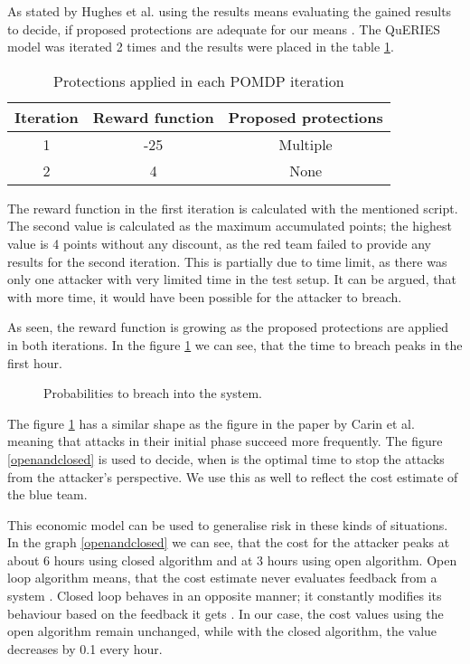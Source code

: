 As stated by Hughes et al. using the results means evaluating
the gained results to decide, if proposed protections are adequate for
our means \cite{hughes2013quantitative}. The QuERIES model was
iterated 2 times and the results were placed in the table \ref{iterationtable}.

\begin{table}[b!]
\centering
\begin{tabular}{|c|c|c|}
  \hline Iteration & Reward function & Proposed protections \\ \hline
  1 & -25 & Multiple \\ \hline 2 & 4 & None \\ \hline
\end{tabular}
\caption{Protections applied in each POMDP iteration}
\label{iterationtable}
\end{table}

The reward function in the first iteration is calculated with the
mentioned script. The second value is calculated as the maximum
accumulated points; the highest value is 4 points without any
discount, as the red team failed to provide any results for the second
iteration. This is partially due to time limit, as there was only one
attacker with very limited time in the test setup. It can be argued,
that with more time, it would have been possible for the attacker to
breach.

As seen, the reward function is growing as the proposed protections
are applied in both iterations. In the figure \ref{timetobreach} we can see, that the time to breach peaks in the
first hour.

\begin{figure}[t!]
\centerline{}
\caption[Probabilities to breach into the system.]{Probabilities to breach into the system.}
\label{timetobreach}
\end{figure}

The figure \ref{timetobreach} has a similar
shape as the figure in the paper by Carin et al. \cite{carin2008cybersecurity} meaning that attacks
in their initial phase succeed more frequently. The figure \ref{openandclosed} is
used to decide, when is the optimal time to stop the attacks from the
attacker's perspective. We use this as well to reflect the cost estimate of
the blue team.

This economic model can be used to generalise risk in these kinds of
situations. In the graph \ref{openandclosed} we can see, that the cost
for the attacker peaks at about 6 hours using closed algorithm and at
3 hours using open algorithm. Open loop algorithm means, that the cost
estimate never evaluates feedback from a system
\cite{bars2006theory}. Closed loop behaves in an opposite manner; it
constantly modifies its behaviour based on the feedback it gets
\cite{bars2006theory}. In our case, the cost values using the open
algorithm remain unchanged, while with the closed algorithm, the value
decreases by 0.1 every hour.

